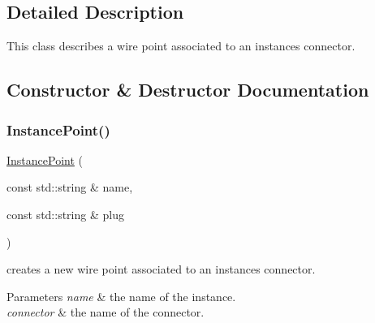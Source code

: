 \subsection{Detailed Description}
This class describes a wire point associated to an instance\textquotesingle{}s connector. 

\subsection{Constructor \& Destructor Documentation}
\mbox{\label{class_open_chams_1_1_instance_point_a1f3b6eda5ef7bb872c96f006021a61f1}} 
\subsubsection{\texorpdfstring{Instance\+Point()}{InstancePoint()}}
{\footnotesize\ttfamily \hyperlink{class_open_chams_1_1_instance_point}{Instance\+Point} (\begin{DoxyParamCaption}\item[{const std\+::string \&}]{name,  }\item[{const std\+::string \&}]{plug }\end{DoxyParamCaption})\hspace{0.3cm}{\ttfamily [inline]}}



creates a new wire point associated to an instance\textquotesingle{}s connector. 


\begin{DoxyParams}{Parameters}
{\em name} & the name of the instance. \\
\hline
{\em connector} & the name of the connector. \\
\hline
\end{DoxyParams}
